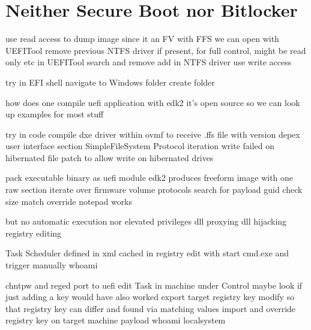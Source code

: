 
\section{Neither Secure Boot nor Bitlocker}
use read access to dump image
since it an FV with FFS we can open with UEFITool
remove previous NTFS driver if present, for full control, might be read only etc
in UEFITool search and remove
add in NTFS driver
use write access

try in EFI shell
navigate to Windows folder
create folder

how does one compile uefi application with edk2
it's open source so we can look up examples for most stuff

try in code
compile dxe driver within ovmf to receive .ffs file with version depex user interface section
SimpleFileSystem Protocol iteration
write failed on hibernated file
patch to allow write on hibernated drives

pack executable binary as uefi module
edk2 produces freeform image with one raw section
iterate over firmware volume protocols
search for payload guid
check size match
override notepad works

but no automatic execution nor elevated privileges
dll proxying
dll hijacking
registry editing

Task Scheduler
defined in xml
cached in registry
edit with start cmd.exe and trigger manually
whoami

chntpw and reged
port to uefi
edit Task in machine under Control
maybe look if just adding a key would have also worked
export target registry key
modify so that registry key can differ and found via matching values
import and override registry key on target machine
payload whoami
localsystem

